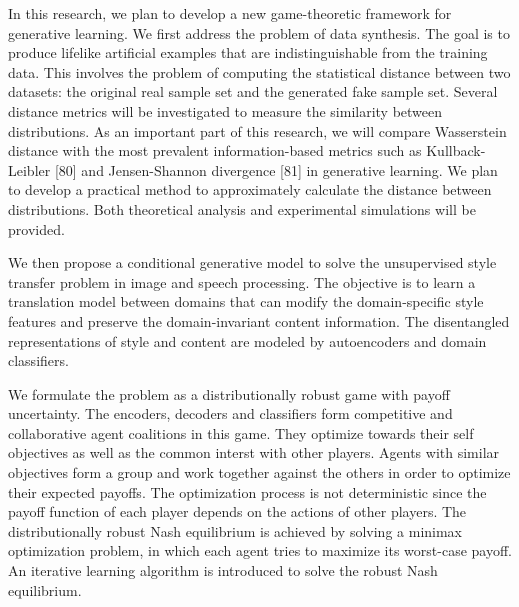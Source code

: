 \documentclass{article}
\begin{document}
In this research, we plan to develop a new game-theoretic framework for generative learning. We first address the problem of data synthesis. The goal is to produce lifelike artificial examples that are indistinguishable from the training data. This involves the problem of computing the statistical distance between two datasets: the original real sample set and the generated fake sample set. Several distance metrics will be investigated to measure the similarity between distributions. As an important part of this research, we will compare Wasserstein distance \cite{Villani} with the most prevalent information-based metrics such as Kullback-Leibler [80] and Jensen-Shannon divergence [81] in generative learning. We plan to develop a practical method to approximately calculate the distance between distributions. Both theoretical analysis and experimental simulations will be provided. %

We then propose a conditional generative model to solve the unsupervised style transfer problem in image and speech processing. The objective is to learn a translation model between domains that can modify the domain-specific style features and preserve the domain-invariant content information. The disentangled representations of style and content are modeled by autoencoders and domain classifiers.

We formulate the problem as a distributionally robust game with payoff uncertainty. The encoders, decoders and classifiers form competitive and collaborative agent coalitions in this game. They optimize towards their self objectives as well as the common interst with other players. Agents with similar objectives form a group and work together against the others in order to optimize their expected payoffs. The optimization process is not deterministic since the payoff function of each player depends on the actions of other players. The distributionally robust Nash equilibrium is achieved by solving a minimax optimization problem, in which each agent tries to maximize its worst-case payoff. An iterative learning algorithm is introduced to solve the robust Nash equilibrium.
\end{document}
